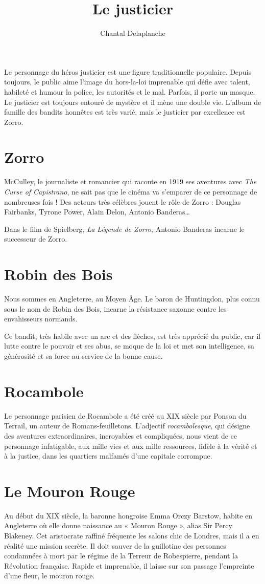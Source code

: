 \documentclass[a5paper,notitlepage]{article}
\author{Chantal Delaplanche}
\title{Le justicier}
\begin{document}
\maketitle
Le personnage du héros justicier est une figure traditionnelle populaire. Depuis toujours, le public aime l'image du
hors-la-loi imprenable qui défie avec talent, habileté et humour la police, les autorités et le mal. Parfois, il porte
un masque. Le justicier est toujours entouré de mystère et il mène une double vie. L'album de famille des bandits
honnêtes est très varié, mais le justicier par excellence est Zorro.

\section*{Zorro}
McCulley, le journaliste et romancier qui raconte en 1919 ses aventures avec \emph{The Curse of Capistrano}, ne sait pas que le
cinéma va s'emparer de ce personnage de nombreuses fois ! Des acteurs très célèbres jouent le rôle de Zorro : Douglas Fairbanks,
Tyrone Power, Alain Delon, Antonio Banderas\ldots{}

Dans le film de Spielberg, \emph{La Légende de Zorro}, Antonio Banderas incarne le successeur de Zorro.

\section*{Robin des Bois}
Nous sommes en Angleterre, au Moyen Âge. Le baron de Huntingdon, plus connu sous le nom de Robin des Bois, incarne la résistance
saxonne contre les envahisseurs normands.

Ce bandit, très habile avec un arc et des flèches, est très apprécié du public, car il lutte contre le pouvoir et ses abus, se
moque de la loi et met son intelligence, sa générosité et sa force au service de la bonne cause.

\section*{Rocambole}
Le personnage parisien de Rocambole a été créé au XIX\ieme{} siècle par Ponson du Terrail, un auteur de Romans-feuilletons.
L'adjectif \emph{rocambolesque}, qui désigne des aventures extraordinaires, incroyables et compliquées, nous vient de ce
personnage infatigable, aux mille vies et aux mille ressources, fidèle à la vérité et à la justice, dans les quartiers malfamés
d'une capitale corrompue.

\section*{Le Mouron Rouge}
Au début du XIX\ieme{} siècle, la baronne hongroise Emma Orczy Barstow, habite en Angleterre où elle donne naissance au « Mouron
Rouge », alias Sir Percy Blakeney. Cet aristocrate raffiné fréquente les salons chic de Londres, mais il a en réalité une mission
secrète. Il doit sauver de la guillotine des personnes condamnées à mort par le régime de la Terreur de Robespierre, pendant la
Révolution française. Rapide et imprenable, il laisse sur son passage l'empreinte d'une fleur, le mouron rouge.
\end{document}
